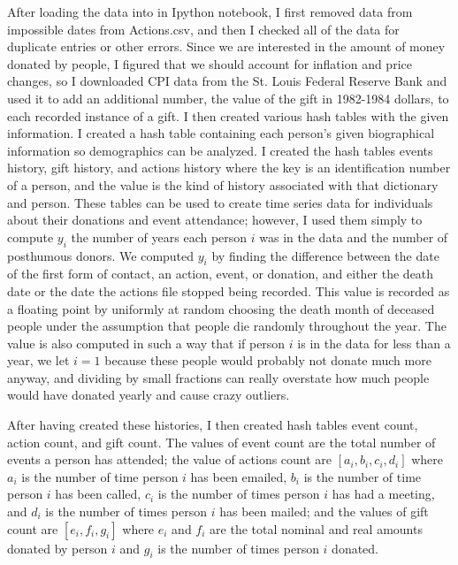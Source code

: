 \documentclass[../main.tex]{subfiles}
\begin{document}
After loading the data into in Ipython notebook, I first removed data from
impossible dates from Actions.csv, and then I checked all of the data for
duplicate entries or other errors. Since we are interested in the amount of
money donated by people, I figured that we should account for inflation and
price changes, so I downloaded CPI data from the St. Louis Federal Reserve
Bank and used it to add an additional number, the value of the gift in
1982-1984 dollars, to each recorded instance of a gift. I then created various hash
tables with the given information. I created a hash table containing each
person's given biographical information so demographics can be analyzed. 
I created the hash tables events history,
gift history, and actions history where the key is an identification number
of a person, and the value is the kind of history associated with that
dictionary and person. These tables can be used to create time series data
for individuals about their donations and event attendance; however, I used
them simply to compute $y_i$ the number of years each person $i$ was in the data and
the number of posthumous donors. We computed $y_i$ by finding the difference
between the date of the first form of contact, an action, event, or
donation, and either the death date or the date the actions file stopped
being recorded. This value is recorded as a floating point by uniformly at
random choosing the death month of deceased people under the assumption that
people die randomly throughout the year. The value is also computed in such
a way that if person $i$ is in the data for less than a year, we let $i = 1$
because these people would probably not donate much more anyway, and
dividing by small fractions can really overstate how much people would have
donated yearly and cause crazy outliers.

After having created these histories, I
then created hash tables event count, action count, and gift count. The
values of event count are the total number of events a person has attended;
the value of actions count are $[a_i, b_i, c_i, d_i]$ where $a_i$ is the
number of time person $i$ has been emailed, $b_i$ is the number of time
person $i$ has been called, $c_i$ is the number of times person $i$ has had
a meeting, and $d_i$ is the number of times person $i$ has been mailed; and
the values of gift count are $[e_i, f_i, g_i]$ where $e_i$ and $f_i$ are the
total nominal and real amounts donated by person $i$ and $g_i$ is the number
of times person $i$ donated.
\end{document}

